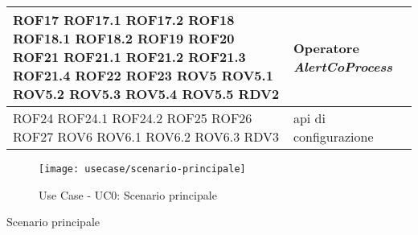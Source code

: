 {\begin{longtable}{L{5cm} L{8.5cm}}
ROF17 \newline ROF17.1 \newline ROF17.2 \newline ROF18 \newline ROF18.1 \newline ROF18.2 \newline ROF19 \newline ROF20 \newline ROF21 \newline ROF21.1 \newline ROF21.2 \newline ROF21.3 \newline ROF21.4 \newline ROF22 \newline ROF23 \newline ROV5 \newline ROV5.1 \newline ROV5.2 \newline ROV5.3 \newline ROV5.4 \newline ROV5.5 \newline RDV2 & Operatore \textit{AlertCoProcess} \\
\hline
ROF24 \newline ROF24.1 \newline ROF24.2 \newline ROF25 \newline ROF26 \newline ROF27 \newline ROV6 \newline ROV6.1 \newline ROV6.2 \newline ROV6.3 \newline RDV3 & \gls{api} di configurazione \\
\hline
\end{longtable}
}





\begin{figure}[!h] 
    \centering 
    \texttt{[image: usecase/scenario-principale]} 
    \caption{Use Case - UC0: Scenario principale}
\end{figure}

\begin{usecase}{0}{Scenario principale}
\label{uc:scenario-principale}
\end{usecase}

